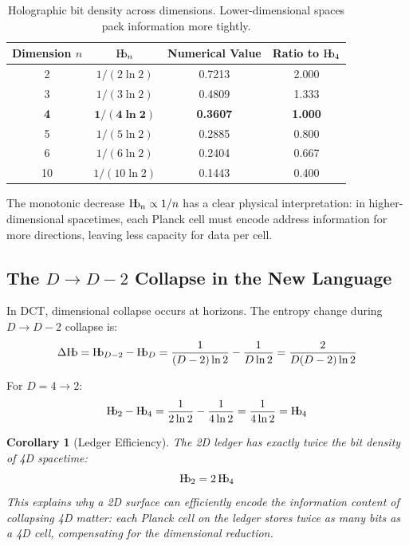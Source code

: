 \documentclass[11pt,a4paper]{article}
\theoremstyle{plain}
\newtheorem{corollary}[theorem]{Corollary}
\theoremstyle{definition}
\newcommand{\Hb}{\textnormal{H\kern-0.3em b}}
\newcommand{\Hbn}{\Hb_n}
\newcommand{\Hbfour}{\Hb_4}
\newcommand{\Hbtwo}{\Hb_2}
\begin{document}
\begin{table}[h]
\centering
\begin{tabular}{cccc}
\toprule
\textbf{Dimension $n$} & \textbf{$\Hbn$} & \textbf{Numerical Value} & \textbf{Ratio to $\Hbfour$} \\
\midrule
2 & $1/(2\ln 2)$ & 0.7213 & 2.000 \\
3 & $1/(3\ln 2)$ & 0.4809 & 1.333 \\
\textbf{4} & $\mathbf{1/(4\ln 2)}$ & \textbf{0.3607} & \textbf{1.000} \\
5 & $1/(5\ln 2)$ & 0.2885 & 0.800 \\
6 & $1/(6\ln 2)$ & 0.2404 & 0.667 \\
10 & $1/(10\ln 2)$ & 0.1443 & 0.400 \\
\bottomrule
\end{tabular}
\caption{Holographic bit density across dimensions. Lower-dimensional spaces pack information more tightly.}
\label{tab:Hb_dimensions}
\end{table}

The monotonic decrease $\Hbn \propto 1/n$ has a clear physical interpretation: in higher-dimensional spacetimes, each Planck cell must encode address information for more directions, leaving less capacity for data per cell.

\subsection{The $D \to D-2$ Collapse in the New Language}

In DCT, dimensional collapse occurs at horizons. The entropy change during $D \to D-2$ collapse is:
\begin{equation}
\Delta \Hb = \Hb_{D-2} - \Hb_D = \frac{1}{(D-2)\ln 2} - \frac{1}{D\ln 2} = \frac{2}{D(D-2)\ln 2}
\label{eq:delta_Hb}
\end{equation}

For $D = 4 \to 2$:
\begin{equation}
\Hbtwo - \Hbfour = \frac{1}{2\ln 2} - \frac{1}{4\ln 2} = \frac{1}{4\ln 2} = \Hbfour
\label{eq:collapse_4to2}
\end{equation}

\begin{corollary}[Ledger Efficiency]
The 2D ledger has exactly twice the bit density of 4D spacetime:
\begin{equation}
\Hbtwo = 2\,\Hbfour
\end{equation}
This explains why a 2D surface can efficiently encode the information content of collapsing 4D matter: each Planck cell on the ledger stores twice as many bits as a 4D cell, compensating for the dimensional reduction.
\end{corollary}
\end{document}
